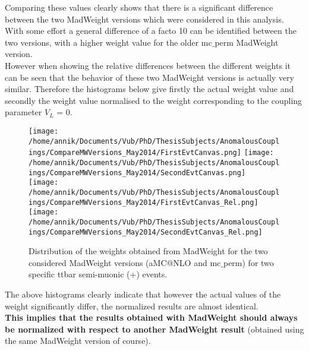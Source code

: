 \documentclass[a4paper,12pt]{report}
\begin{document}
Comparing these values clearly shows that there is a significant difference between the two MadWeight versions which were considered in this analysis. With some effort a general difference of a facto 10 can be identified between the two versions, with a higher weight value for the older mc$\_$perm MadWeight version.\\
However when showing the relative differences between the different weights it can be seen that the behavior of these two MadWeight versions is actually very similar. Therefore the histograms below give firstly the actual weight value and secondly the weight value normalised to the weight corresponding to the coupling parameter $V_L$ = 0.
\begin{figure}[!h]
\texttt{[image: /home/annik/Documents/Vub/PhD/ThesisSubjects/AnomalousCouplings/CompareMWVersions\_May2014/FirstEvtCanvas.png]}
\texttt{[image: /home/annik/Documents/Vub/PhD/ThesisSubjects/AnomalousCouplings/CompareMWVersions\_May2014/SecondEvtCanvas.png]}\\
\texttt{[image: /home/annik/Documents/Vub/PhD/ThesisSubjects/AnomalousCouplings/CompareMWVersions\_May2014/FirstEvtCanvas\_Rel.png]}
\texttt{[image: /home/annik/Documents/Vub/PhD/ThesisSubjects/AnomalousCouplings/CompareMWVersions\_May2014/SecondEvtCanvas\_Rel.png]}
\caption{Distribution of the weights obtained from MadWeight for the two considered MadWeight versions (aMC@NLO and mc$\_$perm) for two specific ttbar semi-muonic (+) events.}
\end{figure}

The above histograms clearly indicate that however the actual values of the weight significantly differ, the normalized results are almost identical.\\
\textbf{This implies that the results obtained with MadWeight should always be normalized with respect to another MadWeight result} (obtained using the same MadWeight version of course). 
\end{document}
